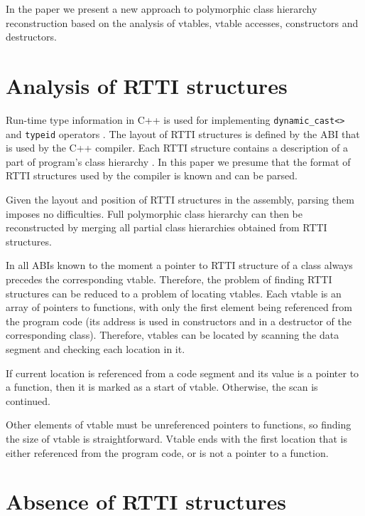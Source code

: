 \documentclass[10pt, conference]{IEEEtran}
\renewenvironment{itemize}{
    \begin{list}{\labelitemi}{\leftmargin=1.0em \itemindent=-0.4em \itemsep=-\parsep}
}{
	\end{list}
}
\begin{document}
In the paper we present a new approach to polymorphic class
hierarchy reconstruction based on the analysis of vtables,
vtable accesses, constructors and destructors.





\section{Analysis of RTTI structures}
\label{sectionRTTIAnalysis}

Run-time type information in C++ is used for
implementing \lstinline{dynamic_cast<>} and \lstinline{typeid} operators \cite{stroustrup97}.
The layout of RTTI structures
is defined by the ABI that is used by the C++ compiler.
Each RTTI structure contains a description of a part of
program's class hierarchy \cite{skochinsky06, gccabi}.
In this paper we presume that the format of RTTI structures
used by the compiler is known and can be parsed.

Given the layout and position of RTTI structures in the assembly,
parsing them imposes no difficulties.
Full polymorphic class hierarchy
can then be reconstructed by merging all partial class hierarchies
obtained from RTTI structures.

In all ABIs known to the moment a pointer to RTTI structure
of a class always precedes the corresponding vtable.
Therefore, the problem of finding RTTI structures can be reduced
to a problem of locating vtables.
Each vtable is an array of pointers to functions,
with only the first element being referenced from the program code
(its address is used in constructors and in a destructor of the corresponding class).
Therefore, vtables can be located by scanning the data segment and
checking each location in it.
\begin{itemize}
\item If current location is referenced from a code segment and
    its value is a pointer to a function, then it is marked as
    a start of vtable. Otherwise, the scan is continued.
\item Other elements of vtable must be unreferenced
    pointers to functions, so finding the size of vtable is
    straightforward. Vtable ends with the first
    location that is either referenced from the program code,
    or is not a pointer to a function.
\end{itemize}





\section{Absence of RTTI structures}
\label{sectionNoRTTIAnalysis}
\end{document}
